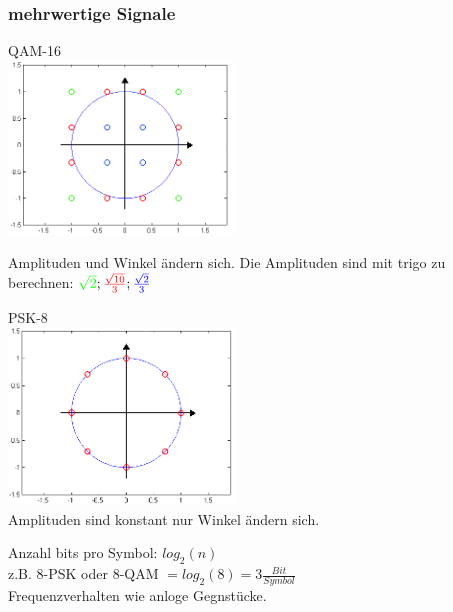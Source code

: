 \subsubsection{mehrwertige Signale}
\begin{multicols}{2}
    \begin{center}
	QAM-16\\
	\includegraphics[width=6cm]{bilder/qam_16.png}\\
	\end{center}
	Amplituden und Winkel ändern sich.
	Die Amplituden sind mit trigo zu berechnen:
	$\textcolor{green}{\sqrt{2}}; \textcolor{red}{\frac{\sqrt{10}}{3}}; \textcolor{blue}{\frac{\sqrt{2}}{3}}$
	\columnbreak

    \begin{center}
	PSK-8\\
	\includegraphics[width=6cm]{bilder/psk_8.png}\\
	Amplituden sind konstant nur Winkel ändern sich.
	\end{center} 

\end{multicols}
	Anzahl bits pro Symbol: $log_2\left(n\right)$\\
	z.B. 8-PSK oder 8-QAM $= log_2(8) = 3 \frac{Bit}{Symbol}$\\
	Frequenzverhalten wie anloge Gegnstücke.
